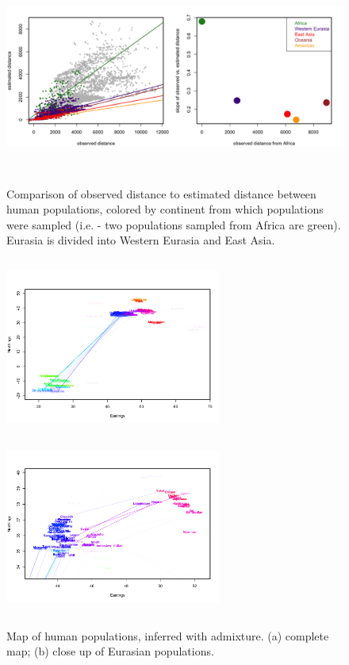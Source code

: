 \documentclass[12pt]{article}
\begin{document}
\begin{figure}
	\centering
		{\includegraphics[width=6in,height=2.5in]{figs/globetrotter/globe_NoAd_dist_decay.png}} %
	\caption{Comparison of observed distance to estimated distance between human populations, colored by continent from which populations were sampled (i.e. - two populations sampled from Africa are green).  Eurasia is divided into Western Eurasia and East Asia.}
\label{sfig:globe_noad_distcomp}
\end{figure}

\begin{figure}
	\centering
			{\includegraphics[width=2.8in,height=2.3in]{figs/globetrotter/globe_Ad_map.png}}
			{\includegraphics[width=2.8in,height=2.3in]{figs/globetrotter/Eurasia_Ad_map.png}}
	\caption{Map of human populations, inferred with admixture. (a) complete map; (b) close up of Eurasian populations.}\label{sfig:globe_ad_maps}
\end{figure}
\end{document}
